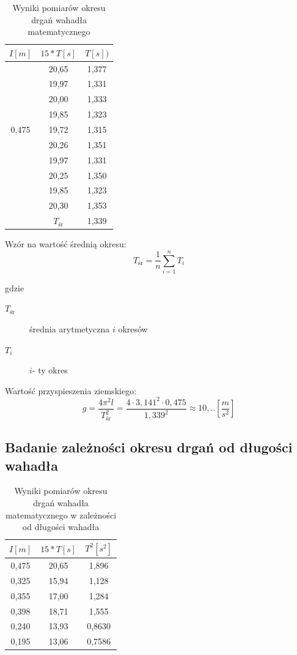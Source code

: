 \documentclass [a4paper,11pt]{article}
\begin{document}
\begin{table}[h!]
\centering
\caption{Wyniki pomiarów okresu drgań wahadła matematycznego}
\begin{tabular}{c|c|c}\hline

\label{table1}
$I[m]$ & $15*T[s]$ & $T[s])$\\ \hline
& 20,65 & 1,377 \\
& 19,97 & 1,331 \\
& 20,00 & 1,333 \\
& 19,85 & 1,323 \\
0,475 & 19,72 & 1,315 \\
& 20,26 & 1,351 \\
& 19,97 & 1,331 \\
& 20,25 & 1,350 \\
& 19,85 & 1,323 \\
& 20,30 & 1,353 \\ \hline
& $T_{\text{śr}}$ & 1,339 \\ \hline
\end{tabular}
\end{table}

\indent Wzór na wartość średnią okresu:
\begin{equation}
\label{wzor:okresSredni}
T_{\text{śr}}  = \frac{1}{n} \sum_{i=1}^{n} T_i
\end{equation}

gdzie
\begin{description}
\item [$T_{\text{śr}}$] średnia arytmetyczna $i$ okresów
\item [$T_{i}$] $i$- ty okres
\end{description}

\indent Wartość przyspieszenia ziemskiego:
\begin{equation}
\label{wzor:g}
g= \frac{4 \pi ^2 l}{ T_{\text{śr}}^2} = \frac{4 \cdot 3,141^2 \cdot 0,475} {1,339^2} \approx 10,.. \left[ \frac{m}{s^2} \right] 
\end{equation}

\subsection{Badanie zależności okresu drgań od długości wahadła}

\begin{table}[h!]
\centering
\caption{Wyniki pomiarów okresu drgań wahadła matematycznego w zależności od długości wahadła}
\begin{tabular}{c|c|c}\hline
\label{table2}
$I[m]$ & $15*T[s]$ & $T^{2}[s^{2}]$\\ \hline
0,475 & 20,65 & 1,896 \\
0,325 & 15,94 & 1,128 \\
0,355 & 17,00 & 1,284 \\
0,398 & 18,71 & 1,555 \\
0,240 & 13,93 & 0,8630 \\
0,195 & 13,06 & 0,7586 \\ \hline

\end{tabular}
\end{table}
\end{document}
